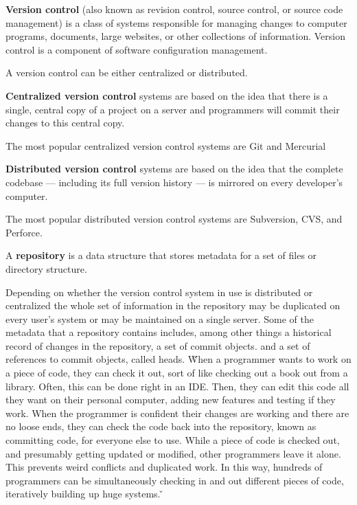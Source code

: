 \textbf{Version control} (also known as revision control, source control, or source code management) is a class of
systems responsible for managing changes to computer programs, documents, large websites, or other collections of
information. Version control is a component of software configuration management.
\ed

A version control can be either centralized or distributed.

\textbf{Centralized version control} systems are based on the idea that there is a single, central copy of a project
on a server and programmers will commit their changes to this central copy.
\ed

The most popular centralized version control systems are Git and Mercurial

\textbf{Distributed version control} systems are based on the idea that the complete codebase — including its full
version history — is mirrored on every developer's computer.
\ed

The most popular distributed version control systems are Subversion, CVS, and Perforce.

\bd[Repository]
A \textbf{repository} is a data structure that stores metadata for a set of files or directory structure.
\ed

Depending on whether the version control system in use is distributed or centralized the whole set of information in
the repository may be duplicated on every user's system or may be maintained on a single server. Some of the metadata
that a repository contains includes, among other things a historical record of changes in the repository, a set of
commit objects. and a set of references to commit objects, called heads. \v

When a programmer wants to work on a piece of code, they can check it out, sort of like checking out a book out from
a library. Often, this can be done right in an IDE. Then, they can edit this code all they want on their personal
computer, adding new features and testing if they work. When the programmer is confident their changes are working
and there are no loose ends, they can check the code back into the repository, known as committing code, for everyone
else to use. While a piece of code is checked out, and presumably getting updated or modified, other programmers
leave it alone. This prevents weird conflicts and duplicated work. In this way, hundreds of programmers can be
simultaneously checking in and out different pieces of code, iteratively building up huge systems. \v

